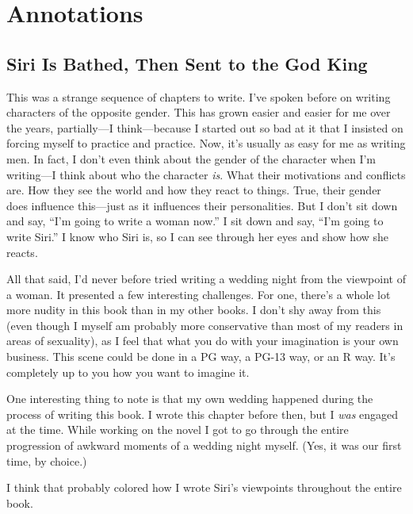 \section*{Annotations}

\subsection*{Siri Is Bathed, Then Sent to the God King}

This was a strange sequence of chapters to write. I’ve spoken before on writing characters of the opposite gender. This has grown easier and easier for me over the years, partially—I think—because I started out so bad at it that I insisted on forcing myself to practice and practice. Now, it’s usually as easy for me as writing men. In fact, I don’t even think about the gender of the character when I’m writing—I think about who the character \textit{is}. What their motivations and conflicts are. How they see the world and how they react to things. True, their gender does influence this—just as it influences their personalities. But I don’t sit down and say, “I’m going to write a woman now.” I sit down and say, “I’m going to write Siri.” I know who Siri is, so I can see through her eyes and show how she reacts.

All that said, I’d never before tried writing a wedding night from the viewpoint of a woman. It presented a few interesting challenges. For one, there’s a whole lot more nudity in this book than in my other books. I don’t shy away from this (even though I myself am probably more conservative than most of my readers in areas of sexuality), as I feel that what you do with your imagination is your own business. This scene could be done in a PG way, a PG-13 way, or an R way. It’s completely up to you how you want to imagine it.

One interesting thing to note is that my own wedding happened during the process of writing this book. I wrote this chapter before then, but I \textit{was} engaged at the time. While working on the novel I got to go through the entire progression of awkward moments of a wedding night myself. (Yes, it was our first time, by choice.)

I think that probably colored how I wrote Siri’s viewpoints throughout the entire book.

